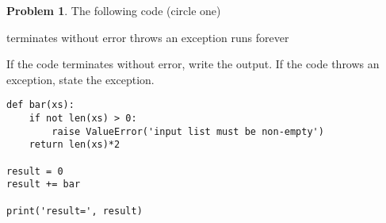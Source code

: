 \documentclass[10pt]{article}
\theoremstyle{definition}
\newtheorem{problem}{Problem}
\begin{document}
\newpage
\begin{problem}
    The following code (circle one)

    \vspace{0.25in}
    \hspace{0.5in}terminates without error 
    \hspace{1in}throws an exception
    \hspace{1in}runs forever
    \vspace{0.25in}

    \noindent
    If the code terminates without error, write the output.
    If the code throws an exception, state the exception.
\end{problem}
\begin{lstlisting}
def bar(xs):
    if not len(xs) > 0:
        raise ValueError('input list must be non-empty')
    return len(xs)*2

result = 0
result += bar

print('result=', result)
\end{lstlisting}
\vspace{0.75in}
\end{document}
